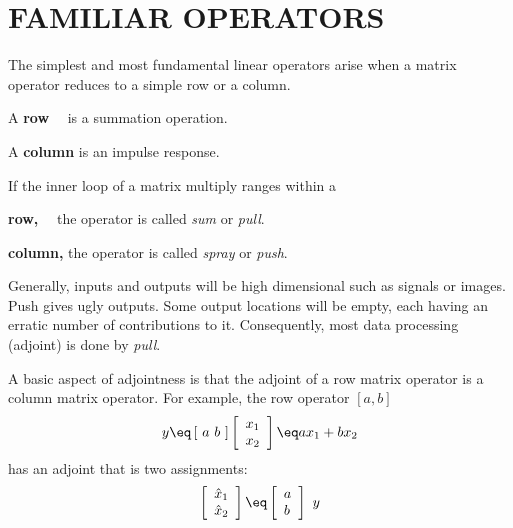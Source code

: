 \section{FAMILIAR OPERATORS}
The simplest and most fundamental linear operators
arise when a matrix operator reduces to a simple row or a column.
\par\noindent
A {\bf row} \quad\ \ is a summation operation.
\par\noindent
A {\bf column}       is an impulse response.
\vspace{.2in}
\par\noindent
If the inner loop of a matrix multiply ranges within a
\par\noindent
{\bf row,} \quad\ \ the operator is called {\em  sum} or {\em  pull}.
\par\noindent
{\bf column,}       the operator is called {\em  spray} or {\em  push}.
\par\noindent
Generally, inputs and outputs will be high dimensional such as signals or images.
Push gives ugly outputs.   Some output locations will be empty,
each having an erratic number of contributions to it.
Consequently, most data processing (adjoint) is done by {\em pull}.

\par
A basic aspect of adjointness is that the
adjoint of a row matrix operator is a column matrix operator.
For example,
the row operator $[a,b]$
\begin{equation}
y \eq
\left[ \ a \ b \ \right] 
\left[
\begin{array}{l}
        x_1 \\
        x_2
\end{array}
\right] 
\eq
a x_1 + b x_2
\end{equation}
has an adjoint that is two assignments:
\begin{equation}
        \left[
        \begin{array}{l}
                \hat x_1 \\
                \hat x_2
        \end{array}
        \right]
        \eq
        \left[
        \begin{array}{l}
                a \\
                b
        \end{array}
        \right]
        \ y
\end{equation}
\par
{}


